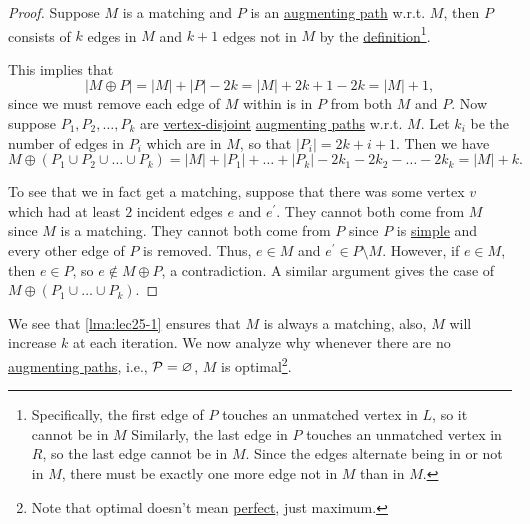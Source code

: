 \begin{proof}
	Suppose \(M\) is a matching and \(P\) is an \hyperref[def:augmenting-path]{augmenting path} w.r.t. \(M\), then \(P\) consists of \(k\) edges in \(M\)
	and \(k+1\) edges not in \(M\) by the \hyperref[def:augmenting-path]{definition}\footnote{Specifically, the first edge of \(P\) touches an unmatched vertex in \(L\),
		so it cannot be in \(M\) Similarly, the last edge in \(P\) touches an unmatched vertex in \(R\), so the last edge cannot be in \(M\). Since
		the edges alternate being in or not in \(M\), there must be exactly one more edge not in \(M\) than in \(M\).}.

	This implies that
	\[
		\left\vert M\oplus P \right\vert = \left\vert M \right\vert + \left\vert P \right\vert - 2k = \left\vert M \right\vert + 2k + 1 - 2k = \left\vert M \right\vert + 1,
	\]
	since we must remove each edge of \(M\) within is in \(P\) from both \(M\) and \(P\). Now suppose \(P_1, P_2, \ldots  , P_k\) are
	\hyperref[def:vertex-independent]{vertex-disjoint} \hyperref[def:augmenting-path]{augmenting paths}
	w.r.t. \(M\). Let \(k_i\) be the number of edges in \(P_{i} \) which are in \(M\), so that \(\left\vert P_{i}  \right\vert = 2k + i + 1\).
	Then we have
	\[
		M \oplus (P_1 \cup P_2 \cup  \ldots  \cup P_k)= \left\vert M \right\vert + \left\vert P_1 \right\vert + \ldots  + \left\vert P_k \right\vert
		- 2k_1 - 2k_2 - \ldots  - 2k_k = \left\vert M \right\vert + k.
	\]

	To see that we in fact get a matching, suppose that there was some vertex \(v\) which had at least \(2\) incident edges \(e\) and \(e^\prime \).
	They cannot both come from \(M\) since \(M\) is a matching. They cannot both come from \(P\) since \(P\) is \hyperref[def:simple-path]{simple}
	and every other edge of \(P\) is removed. Thus, \(e\in M\) and \(e^\prime \in P\setminus M\). However, if
	\(e\in M\), then \(e\in P\), so \(e \notin M\oplus P\), a contradiction. A similar argument gives the case of \(M\oplus (P_1 \cup \ldots \cup P_k )\).
\end{proof}

We see that \autoref{lma:lec25-1} ensures that \(M\) is always a matching, also, \(M\) will increase \(k\) at each iteration. We now analyze why
whenever there are no \hyperref[def:augmenting-path]{augmenting paths}, i.e., \(\mathcal{\MakeUppercase{p}} = \varnothing \), \(M\) is
optimal\footnote{Note that optimal doesn't mean \hyperref[def:perfect-matching]{perfect}, just maximum.}.

